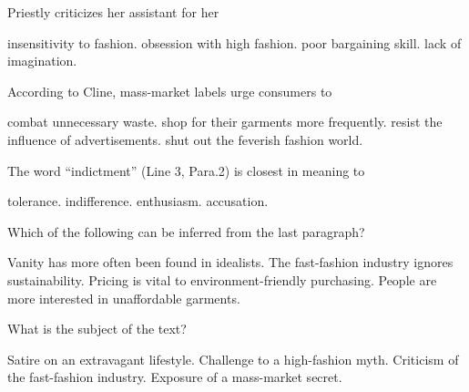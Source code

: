 \item Priestly criticizes her assistant for her
\begin{tasks}
	\task insensitivity to fashion.
	\task obsession with high fashion.
	\task poor bargaining skill.
	\task lack of imagination.
\end{tasks}
\item According to Cline, mass-market labels urge consumers to
\begin{tasks}
	\task combat unnecessary waste.
	\task shop for their garments more frequently.
	\task resist the influence of advertisements.
	\task shut out the feverish fashion world.
\end{tasks}
\item The word ``indictment'' (Line 3, Para.2) is closest in meaning to
\begin{tasks}
	\task tolerance.
	\task indifference.
	\task enthusiasm.
	\task accusation.
\end{tasks}
\item Which of the following can be inferred from the last paragraph?
\begin{tasks}
	\task Vanity has more often been found in idealists.
	\task The fast-fashion industry ignores sustainability.
	\task Pricing is vital to environment-friendly purchasing.
	\task People are more interested in unaffordable garments.
\end{tasks}
\item What is the subject of the text?
\begin{tasks}
	\task Satire on an extravagant lifestyle.
	\task Challenge to a high-fashion myth.
	\task Criticism of the fast-fashion industry.
	\task Exposure of a mass-market secret.
\end{tasks}